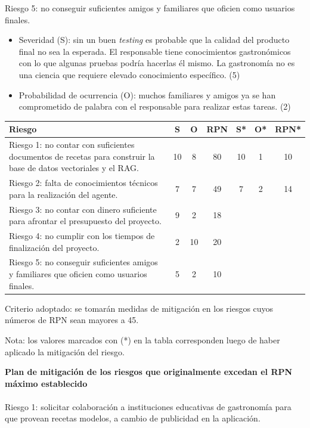 \documentclass[
11pt, %
]{charter}
\begin{document}
Riesgo 5: no conseguir suficientes amigos y familiares que oficien como usuarios finales.
\begin{itemize}
\item Severidad (S): sin un buen \textit{testing} es probable que la calidad del producto final no sea la esperada. El responsable tiene conocimientos gastronómicos con lo que algunas pruebas podría hacerlas él mismo. La gastronomía no es una ciencia que requiere elevado conocimiento específico. (5)
\item Probabilidad de ocurrencia (O): muchos familiares y amigos ya se han comprometido de palabra con el responsable para realizar estas tareas. (2)
\end{itemize}



\begin{table}[htpb]
\centering
\begin{tabularx}{\linewidth}{@{}|X|c|c|c|c|c|c|@{}}
\hline
\rowcolor[HTML]{C0C0C0} 
Riesgo & S & O & RPN & S* & O* & RPN* \\ \hline
Riesgo 1: no contar con suficientes documentos de recetas para construir la base de datos vectoriales y el RAG.      & 10   & 8  &  80   & 10   &  1  &   10   \\ \hline
Riesgo 2: falta de conocimientos técnicos para la realización del agente.     & 7  & 7  &  49   & 7   &  2  &    14  \\ \hline
Riesgo 3: no contar con dinero suficiente para afrontar el presupuesto del proyecto.       & 9  & 2  &   18  &    &    &      \\ \hline
Riesgo 4: no cumplir con los tiempos de finalización del proyecto.       &  2 & 10  &   20  &    &    &      \\ \hline
Riesgo 5: no conseguir suficientes amigos y familiares que oficien como usuarios finales.       & 5  &  2 &    10 &    &    &      \\ \hline
\end{tabularx}%
\end{table}

Criterio adoptado: se tomarán medidas de mitigación en los riesgos cuyos números de RPN
sean mayores a 45.

Nota: los valores marcados con (*) en la tabla corresponden luego de haber aplicado la
mitigación del riesgo.


\textbf{Plan de mitigación de los riesgos que originalmente excedan el RPN máximo establecido}\\\\
Riesgo 1: solicitar colaboración a instituciones educativas de gastronomía para que provean recetas modelos, a cambio de publicidad en la aplicación.
\end{document}
